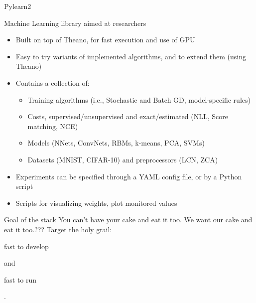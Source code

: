 \documentclass[utf8x,xcolor=pdftex,dvipsnames,table]{beamer}
\begin{document}
\begin{frame}{Pylearn2}

  Machine Learning library aimed at researchers

  \begin{itemize}
    \item Built on top of Theano, for fast execution and use of GPU
    \item Easy to try variants of implemented algorithms, and to extend them (using Theano)
    \item Contains a collection of:
    \begin{itemize}
      \item Training algorithms (i.e., Stochastic and Batch GD, model-specific rules)
      \item Costs, supervised/unsupervised and exact/estimated (NLL, Score matching, NCE)
      \item Models (NNets, ConvNets, RBMs, k-means, PCA, SVMs)
      \item Datasets (MNIST, CIFAR-10) and preprocessors (LCN, ZCA)
    \end{itemize}
    \item Experiments can be specified through a YAML config file, or by a Python script
    \item Scripts for visualizing weights, plot monitored values
  \end{itemize}
\end{frame}


\begin{frame}{Goal of the stack}
You can't have your cake and eat it too.\newline
We want our cake and eat it too.???\newline
Target the holy grail: \begin{bf}fast to develop\end{bf} and \begin{bf}fast to run\end{bf}.
\end{frame}
\end{document}
